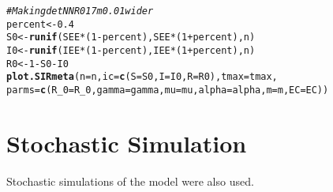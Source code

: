\documentclass{article}\usepackage[]{graphicx}\usepackage[]{color}
\makeatletter
\newcommand{\hlnum}[1]{\textcolor[rgb]{0.686,0.059,0.569}{#1}}%
\newcommand{\hlcom}[1]{\textcolor[rgb]{0.678,0.584,0.686}{\textit{#1}}}%
\newcommand{\hlopt}[1]{\textcolor[rgb]{0,0,0}{#1}}%
\newcommand{\hlstd}[1]{\textcolor[rgb]{0.345,0.345,0.345}{#1}}%
\newcommand{\hlkwb}[1]{\textcolor[rgb]{0.69,0.353,0.396}{#1}}%
\newcommand{\hlkwc}[1]{\textcolor[rgb]{0.333,0.667,0.333}{#1}}%
\newcommand{\hlkwd}[1]{\textcolor[rgb]{0.737,0.353,0.396}{\textbf{#1}}}%
\newenvironment{kframe}{%
 \def\at@end@of@kframe{}%
 \ifinner\ifhmode%
  \def\at@end@of@kframe{\end{minipage}}%
  \begin{minipage}{\columnwidth}%
 \fi\fi%
 \def\FrameCommand##1{\hskip\@totalleftmargin \hskip-\fboxsep
 \colorbox{shadecolor}{##1}\hskip-\fboxsep
     \hskip-\linewidth \hskip-\@totalleftmargin \hskip\columnwidth}%
 \MakeFramed {\advance\hsize-\width
   \@totalleftmargin\z@ \linewidth\hsize
   \@setminipage}}%
 {\par\unskip\endMakeFramed%
 \at@end@of@kframe}
\newenvironment{knitrout}{}{} %
\makeatother
\begin{document}
\begin{knitrout}
\begin{kframe}
\begin{alltt}
\hlcom{#Making detNNR017m0.01wider}
\hlstd{percent} \hlkwb{<-} \hlnum{0.4}
\hlstd{S0} \hlkwb{<-} \hlkwd{runif}\hlstd{(SEE}\hlopt{*}\hlstd{(}\hlnum{1}\hlopt{-}\hlstd{percent), SEE}\hlopt{*}\hlstd{(}\hlnum{1}\hlopt{+}\hlstd{percent), n)}
\hlstd{I0} \hlkwb{<-} \hlkwd{runif}\hlstd{(IEE}\hlopt{*}\hlstd{(}\hlnum{1}\hlopt{-}\hlstd{percent), IEE}\hlopt{*}\hlstd{(}\hlnum{1}\hlopt{+}\hlstd{percent), n)}
\hlstd{R0} \hlkwb{<-} \hlnum{1}\hlopt{-}\hlstd{S0}\hlopt{-}\hlstd{I0}
\hlkwd{plot.SIRmeta}\hlstd{(}\hlkwc{n}\hlstd{=n,}\hlkwc{ic}\hlstd{=}\hlkwd{c}\hlstd{(}\hlkwc{S}\hlstd{=S0,}\hlkwc{I}\hlstd{=I0,}\hlkwc{R}\hlstd{=R0),}\hlkwc{tmax}\hlstd{=tmax,}
                      \hlkwc{parms}\hlstd{=}\hlkwd{c}\hlstd{(}\hlkwc{R_0}\hlstd{=R_0,}\hlkwc{gamma}\hlstd{=gamma,}\hlkwc{mu}\hlstd{=mu,}\hlkwc{alpha}\hlstd{=alpha,}\hlkwc{m}\hlstd{=m,}\hlkwc{EC}\hlstd{=EC))}
\end{alltt}
\end{kframe}
\end{knitrout}


\section{Stochastic Simulation}
Stochastic simulations of the model were also used. 
\end{document}
